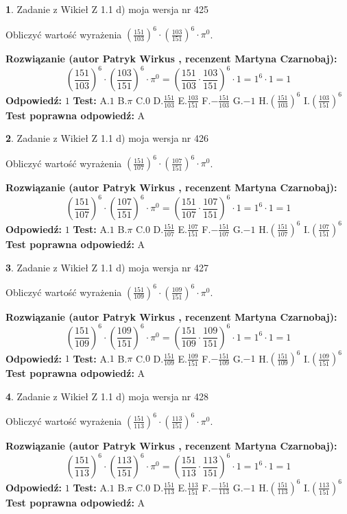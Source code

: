 \documentclass[12pt, a4paper]{article}
\theoremstyle{definition} %
\newtheorem{zad}{}
\newcommand{\zadStart}[1]{\begin{zad}#1\newline}
\newcommand{\zadStop}{\end{zad}}
\newcommand{\rozwStart}[2]{\noindent \textbf{Rozwiązanie (autor #1 , recenzent #2): }\newline}
\newcommand{\rozwStop}{\newline}
\newcommand{\odpStart}{\noindent \textbf{Odpowiedź:}\newline}
\newcommand{\odpStop}{\newline}
\newcommand{\testStart}{\noindent \textbf{Test:}\newline}
\newcommand{\testStop}{\newline}
\newcommand{\kluczStart}{\noindent \textbf{Test poprawna odpowiedź:}\newline}
\newcommand{\kluczStop}{\newline}
\begin{document}
\zadStart{Zadanie z Wikieł Z 1.1 d) moja wersja nr 425}

Obliczyć wartość wyrażenia $(\frac{151}{103})^{6} \cdot (\frac{103}{151})^{6} \cdot \pi^{0}$.
\zadStop
\rozwStart{Patryk Wirkus}{Martyna Czarnobaj}
$$(\frac{151}{103})^{6} \cdot (\frac{103}{151})^{6} \cdot \pi^{0} = (\frac{151}{103} \cdot \frac{103}{151})^{6} \cdot 1 = 1^{6} \cdot 1 = 1$$
\rozwStop
\odpStart
$1$
\odpStop
\testStart
A.$1$ B.$\pi$ C.$0$ D.$\frac{151}{103}$ E.$\frac{103}{151}$
F.$-\frac{151}{103}$ G.$-1$
H.$(\frac{151}{103})^{6}$
I.$(\frac{103}{151})^{6}$
\testStop
\kluczStart
A
\kluczStop



\zadStart{Zadanie z Wikieł Z 1.1 d) moja wersja nr 426}

Obliczyć wartość wyrażenia $(\frac{151}{107})^{6} \cdot (\frac{107}{151})^{6} \cdot \pi^{0}$.
\zadStop
\rozwStart{Patryk Wirkus}{Martyna Czarnobaj}
$$(\frac{151}{107})^{6} \cdot (\frac{107}{151})^{6} \cdot \pi^{0} = (\frac{151}{107} \cdot \frac{107}{151})^{6} \cdot 1 = 1^{6} \cdot 1 = 1$$
\rozwStop
\odpStart
$1$
\odpStop
\testStart
A.$1$ B.$\pi$ C.$0$ D.$\frac{151}{107}$ E.$\frac{107}{151}$
F.$-\frac{151}{107}$ G.$-1$
H.$(\frac{151}{107})^{6}$
I.$(\frac{107}{151})^{6}$
\testStop
\kluczStart
A
\kluczStop



\zadStart{Zadanie z Wikieł Z 1.1 d) moja wersja nr 427}

Obliczyć wartość wyrażenia $(\frac{151}{109})^{6} \cdot (\frac{109}{151})^{6} \cdot \pi^{0}$.
\zadStop
\rozwStart{Patryk Wirkus}{Martyna Czarnobaj}
$$(\frac{151}{109})^{6} \cdot (\frac{109}{151})^{6} \cdot \pi^{0} = (\frac{151}{109} \cdot \frac{109}{151})^{6} \cdot 1 = 1^{6} \cdot 1 = 1$$
\rozwStop
\odpStart
$1$
\odpStop
\testStart
A.$1$ B.$\pi$ C.$0$ D.$\frac{151}{109}$ E.$\frac{109}{151}$
F.$-\frac{151}{109}$ G.$-1$
H.$(\frac{151}{109})^{6}$
I.$(\frac{109}{151})^{6}$
\testStop
\kluczStart
A
\kluczStop



\zadStart{Zadanie z Wikieł Z 1.1 d) moja wersja nr 428}

Obliczyć wartość wyrażenia $(\frac{151}{113})^{6} \cdot (\frac{113}{151})^{6} \cdot \pi^{0}$.
\zadStop
\rozwStart{Patryk Wirkus}{Martyna Czarnobaj}
$$(\frac{151}{113})^{6} \cdot (\frac{113}{151})^{6} \cdot \pi^{0} = (\frac{151}{113} \cdot \frac{113}{151})^{6} \cdot 1 = 1^{6} \cdot 1 = 1$$
\rozwStop
\odpStart
$1$
\odpStop
\testStart
A.$1$ B.$\pi$ C.$0$ D.$\frac{151}{113}$ E.$\frac{113}{151}$
F.$-\frac{151}{113}$ G.$-1$
H.$(\frac{151}{113})^{6}$
I.$(\frac{113}{151})^{6}$
\testStop
\kluczStart
A
\kluczStop
\end{document}
